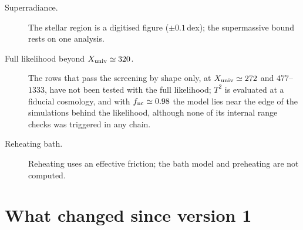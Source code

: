 \documentclass[11pt,a4paper]{article}
\newcommand{\Xu}{X_{\rm univ}}
\begin{document}
\begin{description}
\item[Superradiance.] The stellar region is a digitised figure ($\pm0.1$\,dex); the supermassive bound rests on one analysis.
\item[Full likelihood beyond $\Xu\simeq320$.] The rows that pass the screening by shape only, at $\Xu\simeq272$ and $477$--$1333$, have not been tested with the full likelihood; $T^2$ is evaluated at a fiducial cosmology, and with $f_{\rm nc}\simeq0.98$ the model lies near the edge of the simulations behind the likelihood, although none of its internal range checks was triggered in any chain.
\item[Reheating bath.] Reheating uses an effective friction; the bath model and preheating are not computed.
\end{description}

\section{What changed since version 1}
\label{sec:changes}
\end{document}
